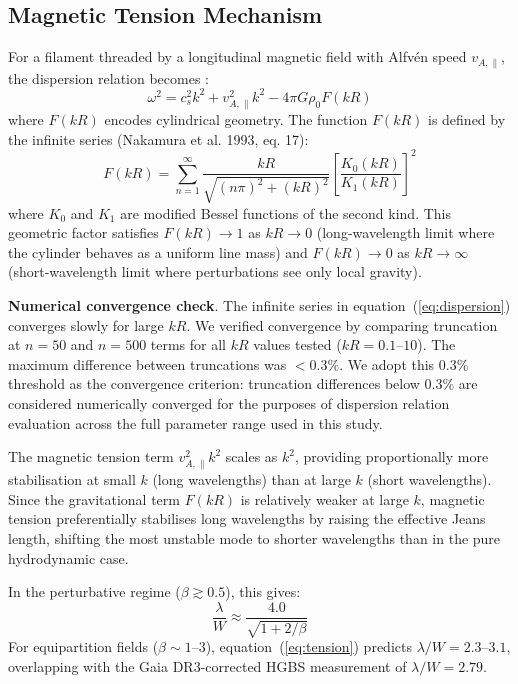 \documentclass[twocolumn,usenatbib]{mnras}
\begin{document}
\subsection{Magnetic Tension Mechanism}

For a filament threaded by a longitudinal magnetic field with Alfv\'en speed $v_{A,\parallel}$, the dispersion relation becomes \citep{Nakamura1993}:
\begin{equation}
\omega^2 = c_s^2 k^2 + v_{A,\parallel}^2 k^2 - 4\pi G\rho_0 F(kR)
\label{eq:dispersion}
\end{equation}
where $F(kR)$ encodes cylindrical geometry. The function $F(kR)$ is defined by the infinite series (Nakamura et al. 1993, eq. 17):
\begin{equation}
F(kR) = \sum_{n=1}^{\infty} \frac{kR}{\sqrt{(n\pi)^2 + (kR)^2}} \left[\frac{K_0(kR)}{K_1(kR)}\right]^2
\end{equation}
where $K_0$ and $K_1$ are modified Bessel functions of the second kind. This geometric factor satisfies $F(kR) \to 1$ as $kR \to 0$ (long-wavelength limit where the cylinder behaves as a uniform line mass) and $F(kR) \to 0$ as $kR \to \infty$ (short-wavelength limit where perturbations see only local gravity).

\textbf{Numerical convergence check}. The infinite series in equation~(\ref{eq:dispersion}) converges slowly for large $kR$. We verified convergence by comparing truncation at $n = 50$ and $n = 500$ terms for all $kR$ values tested ($kR = 0.1$--$10$). The maximum difference between truncations was $<0.3\%$. We adopt this 0.3\% threshold as the convergence criterion: truncation differences below 0.3\% are considered numerically converged for the purposes of dispersion relation evaluation across the full parameter range used in this study.

The magnetic tension term $v_{A,\parallel}^2 k^2$ scales as $k^2$, providing proportionally more stabilisation at small $k$ (long wavelengths) than at large $k$ (short wavelengths). Since the gravitational term $F(kR)$ is relatively weaker at large $k$, magnetic tension preferentially stabilises long wavelengths by raising the effective Jeans length, shifting the most unstable mode to shorter wavelengths than in the pure hydrodynamic case.

In the perturbative regime ($\beta \gtrsim 0.5$), this gives:
\begin{equation}
\frac{\lambda}{W} \approx \frac{4.0}{\sqrt{1 + 2/\beta}}
\label{eq:tension}
\end{equation}
For equipartition fields ($\beta \sim 1$--$3$), equation~(\ref{eq:tension}) predicts $\lambda/W = 2.3$--$3.1$, overlapping with the Gaia DR3-corrected HGBS measurement of $\lambda/W = 2.79$.
\end{document}
